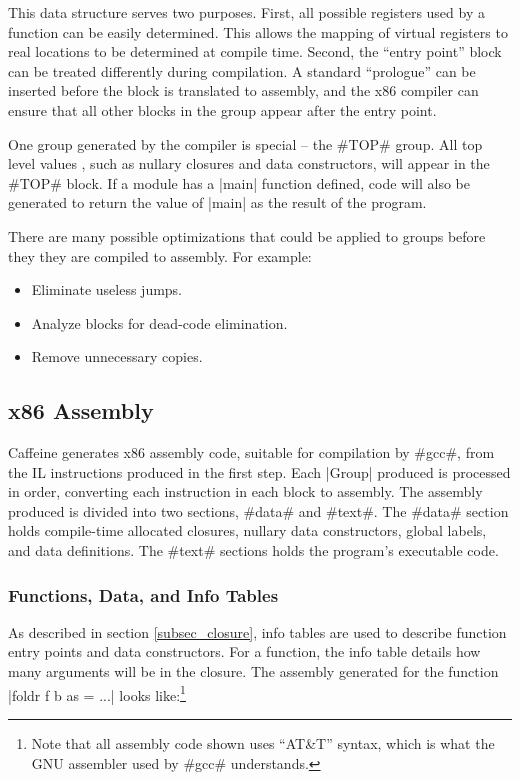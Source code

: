 \documentclass[11pt]{article}
\begin{document}
This data structure serves two purposes. First, all possible registers
used by a function can be easily determined. This allows the mapping
of virtual registers to real locations to be determined at compile
time. Second, the ``entry point'' block can be treated differently
during compilation. A standard ``prologue'' can be inserted before the
block is translated to assembly, and the x86 compiler can ensure that
all other blocks in the group appear after the entry point.

One group generated by the compiler is special -- the #TOP# group. All
top level values , such as nullary closures and data constructors,
will appear in the #TOP# block.  If a module has a |main| function
defined, code will also be generated to return the value of |main| as the
result of the program.

There are many possible optimizations that could be applied to groups
before they they are compiled to assembly. For example:

\begin{itemize}
  \item Eliminate useless jumps.
  \item Analyze blocks for dead-code elimination.
  \item Remove unnecessary copies.
\end{itemize}

\subsection{x86 Assembly}

Caffeine generates x86 assembly code, suitable for compilation by
#gcc#, from the IL instructions produced in the first step. Each
|Group| produced is processed in order, converting each instruction in
each block to assembly. The assembly produced is divided into two
sections, #data# and #text#. The #data# section holds
compile-time allocated closures, nullary data constructors, global
labels, and data definitions. The #text# sections holds the
program's executable code.

\subsubsection{Functions, Data, and Info Tables}

As described in section \ref{subsec_closure}, info tables are used to
describe function entry points and data constructors. For a function,
the info table details how many arguments will be in the closure. The
assembly generated for the function |foldr f b as = ...| looks
like:\footnote{Note that all assembly code shown uses ``AT\&T''
  syntax, which is what the GNU assembler used by #gcc# understands.}
\end{document}
